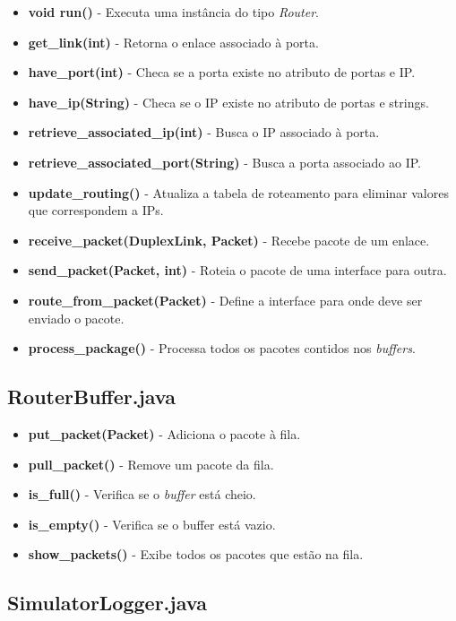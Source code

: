 \documentclass[11pt]{article}
\begin{document}
\begin{itemize}
	\item \textbf{void run()} - Executa uma instância do tipo \textit{Router}.
	\item \textbf{get\_link(int)} - Retorna o enlace associado à porta.
	\item \textbf{have\_port(int)} - Checa se a porta existe no atributo de portas e IP.
	\item \textbf{have\_ip(String)} - Checa se o IP existe no atributo de portas e strings.
	\item \textbf{retrieve\_associated\_ip(int)} - Busca o IP associado à porta.
	\item \textbf{retrieve\_associated\_port(String)} - Busca a porta associado ao IP.
	\item \textbf{update\_routing()} - Atualiza a tabela de roteamento para eliminar valores que correspondem a IPs.
	\item \textbf{receive\_packet(DuplexLink, Packet)} - Recebe pacote de um enlace.
	\item \textbf{send\_packet(Packet, int)} - Roteia o pacote de uma interface para outra.
	\item \textbf{route\_from\_packet(Packet)} - Define a interface para onde deve ser enviado o pacote.
	\item \textbf{process\_package()} - Processa todos os pacotes contidos nos \textit{buffers}.
\end{itemize}

\subsection{RouterBuffer.java}

\begin{itemize}
	\item \textbf{put\_packet(Packet)} - Adiciona o pacote à fila.
	\item \textbf{pull\_packet()} - Remove um pacote da fila.
	\item \textbf{is\_full()} - Verifica se o \textit{buffer} está cheio.
	\item \textbf{is\_empty()} - Verifica se o buffer está vazio.
	\item \textbf{show\_packets()} - Exibe todos os pacotes que estão na fila.
\end{itemize}

\subsection{SimulatorLogger.java}
\end{document}
